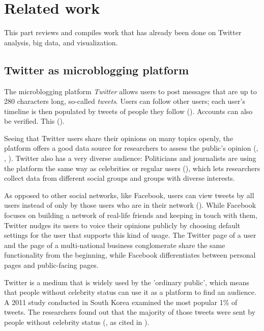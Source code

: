 \section{Related work}
This part reviews and compiles work that has already been done on Twitter analysis, big data, and visualization.

\subsection{Twitter as microblogging platform}
The microblogging platform \emph{Twitter} allows users to post messages that are up to 280 characters long, so-called \emph{tweets}. Users can follow other users; each user's timeline is then populated by tweets of people they follow (\cite{thimmTwitterAlsWahlkampfmedium2012}). Accounts can also be verified. This  (\cite{twitterinc.VerifiedAccounts}).

Seeing that Twitter users share their opinions on many topics openly, the platform offers a good data source for researchers to assess the public's opinion (\cite{pak2010twitter}, \cite{pfaffenberger2016twitter}, \cite{broniatowski2014twitter}). Twitter also has a very diverse audience: Politicians and journalists are using the platform the same way as celebrities or regular users (\cite{pak2010twitter}), which lets researchers collect data from different social groups and groups with diverse interests.

As opposed to other social networks, like Facebook, users can view tweets by all users instead of only by those users who are in their network (\cite{parkDoesTwitterMotivate2013}). While Facebook focuses on building a network of real-life friends and keeping in touch with them, Twitter nudges its users to voice their opinions publicly by choosing default settings for the user that supports this kind of usage. The Twitter page of a user and the page of a multi-national business conglomerate share the same functionality from the beginning, while Facebook differentiates between personal pages and public-facing pages.

Twitter is a medium that is widely used by the 'ordinary public', which means that people without celebrity status can use it as a platform to find an audience. A 2011 study conducted in South Korea examined the most popular 1\% of tweets. The researchers found out that the majority of those tweets were sent by people without celebrity status (\cite{chang2011structure}, as cited in \cite{parkDoesTwitterMotivate2013}).


